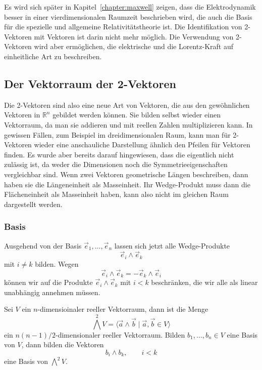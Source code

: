 Es wird sich später in Kapitel~\ref{chapter:maxwell}
zeigen, dass die Elektrodynamik besser in einer
%
vierdimensionalen Raumzeit beschrieben wird, die auch die Basis für
%
die spezielle und allgemeine Relativitätstheorie ist.
%
Die Identifikation von 2-Vektoren mit Vektoren ist darin nicht
mehr möglich.
Die Verwendung von 2-Vektoren wird aber ermöglichen, die elektrische 
und die Lorentz-Kraft auf einheitliche Art zu beschreiben.

%
%
\subsection{Der Vektorraum der 2-Vektoren}
Die 2-Vektoren sind also eine neue Art von Vektoren, die aus den
gewöhnlichen Vektoren in $\mathbb{R}^n$ gebildet werden können.
Sie bilden selbst wieder einen Vektorraum, da man sie addieren
und mit reellen Zahlen multiplizieren kann.
In gewissen Fällen, zum Beispiel im dreidimensionalen Raum, kann
man für 2-Vektoren wieder eine anschauliche Darstellung ähnlich den
Pfeilen für Vektoren finden.
Es wurde aber bereits darauf hingewiesen, dass die eigentlich nicht
zulässig ist, da weder die Dimensionen noch die Symmetrieeigenschaften
vergleichbar sind.
Wenn zwei Vektoren geometrische Längen beschreiben, dann haben sie
die Längeneinheit als Masseinheit.
Ihr Wedge-Produkt muss dann die Flächeneinheit als Masseinheit haben,
kann also nicht im gleichen Raum dargestellt werden.

\subsubsection{Basis}
Ausgehend von der Basis $\vec{e}_1,\dots,\vec{e}_n$ lassen sich jetzt
alle Wedge-Produkte
\[
\vec{e}_i\wedge \vec{e}_k
\]
mit $i\ne k$ bilden.
Wegen
\[
\vec{e}_i\wedge\vec{e}_k
=-
\vec{e}_k\wedge\vec{e}_i
\]
können wir auf die Produkte $\vec{e}_i\wedge\vec{e}_k$ mit $i<k$
beschränken, die wir alle als linear unabhängig annehmen müssen.

\begin{definition}
%
Sei $V$ ein $n$-dimensioinaler reeller Vektorraum, dann ist die Menge
\[
{\textstyle
\bigwedge^2 V}
= \langle \vec{a}\wedge\vec{b} \mid \vec{a},\vec{b}\in V \rangle
\]
ein $n(n-1)/2$-dimensionaler reeller Vektorraum.
Bilden $b_1,\dots,b_n\in V$  eine Basis von $V$, dann bilden die Vektoren
\[
b_i\wedge b_k,\qquad i<k
\]
eine Basis von $\bigwedge^2 V$.
\end{definition}

